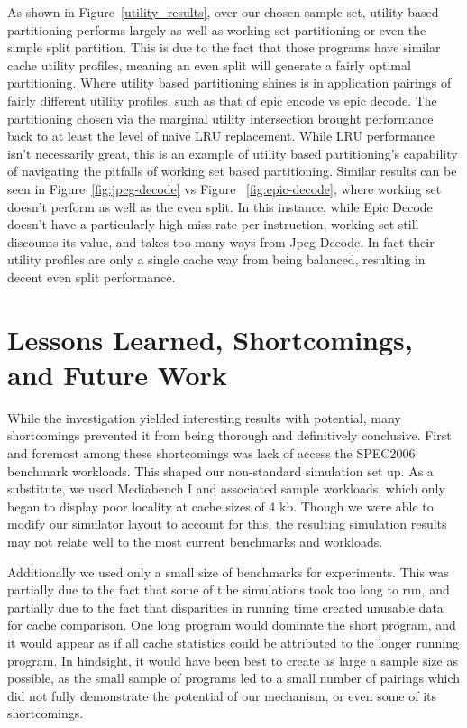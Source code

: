 \documentclass{acm_proc_article-sp}
\begin{document}
As shown in Figure~\ref{utility_results}, over our chosen sample set, utility based partitioning performs largely as well as working set partitioning or even the simple split partition. This is due to the fact that those programs have similar cache utility profiles, meaning an even split
will generate a fairly optimal partitioning. Where utility based partitioning shines is in application pairings of fairly different
utility profiles, such as that of epic encode vs epic decode. The partitioning chosen via the marginal utility intersection brought performance back to at least the level of naive LRU replacement. While LRU performance isn't necessarily great,  this is an example of utility based partitioning's capability of navigating the pitfalls of working set based partitioning. Similar results can be seen in Figure~\ref{fig:jpeg-decode} vs Figure ~\ref{fig:epic-decode}, where working set doesn't perform as well as the even split. In this instance, while Epic Decode doesn't have a particularly high miss rate per instruction, working set still discounts its value, and takes too many ways from Jpeg Decode.  In fact their utility profiles are only a single cache way from being balanced, resulting in decent even split performance.

\section{Lessons Learned, Shortcomings, and Future Work}
 
While the investigation yielded interesting results with potential, many shortcomings prevented it from being thorough and definitively conclusive. First and foremost among these shortcomings was lack of access the SPEC2006 benchmark workloads. This shaped our non-standard simulation set up. As a substitute, we used Mediabench I and associated sample workloads, which only began to display poor locality at cache sizes of 4 kb. Though we were able to modify our simulator layout to account for this, the resulting simulation results may not relate well to the most current benchmarks and workloads.

Additionally we used only a small size of benchmarks for experiments. This was partially due to the fact that some of t:he simulations took too long to run, and partially due to the fact that disparities in running time created unusable data for
cache comparison. One long program would dominate the short program, and it would appear as if all cache statistics could be attributed to the longer running program. In hindsight, it would have been best to create as large a sample size
as possible, as the small sample of programs led to a small number of pairings which did not fully demonstrate the potential of our mechanism, or even some of its shortcomings.
\end{document}
